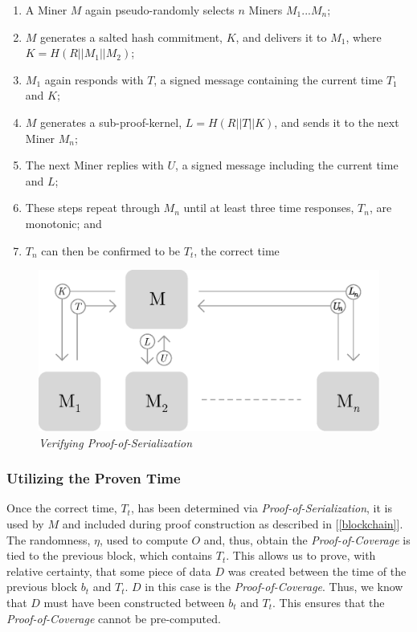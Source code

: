 \documentclass[10pt, nonatbib, nocopyrightspace, reprint]{sigplanconf}
\newcommand{\secref}[1]{[\autoref{#1}]}
\begin{document}
\begin{enumerate}
    \item A Miner $M$ again pseudo-randomly selects $n$ Miners $M_1$...$M_n$;
    \item $M$ generates a salted hash commitment, $K$, and delivers it to $M_1$, where ${K = H\left(R || M_1 || M_2\right)}$;
    \item $M_1$ again responds with $T$, a signed message containing the current time $T_1$ and $K$;
    \item $M$ generates a sub-proof-kernel, $L = H\left(R || T || K\right)$, and sends it to the next Miner $M_n$;
    \item The next Miner replies with $U$, a signed message including the current time and $L$;
    \item These steps repeat through $M_n$ until at least three time responses, $T_n$, are monotonic; and
    \item $T_n$ can then be confirmed to be $T_t$, the correct time
\end{enumerate}

\begin{figure}[ht]
    \begin{center}
          \includegraphics[width=\columnwidth]{verify_serialization.eps}
          \caption{\emph{Verifying Proof-of-Serialization}}\label{fig:verify-serialization}
     \end{center}
\end{figure}

\subsubsection{Utilizing the Proven Time}

Once the correct time, $T_t$, has been determined via \emph{Proof-of-Serialization}, it is used by $M$ and included during proof construction as described in \secref{blockchain}. The randomness, $\eta$, used to compute $O$ and, thus, obtain the \emph{Proof-of-Coverage} is tied to the previous block, which contains $T_t$. This allows us to prove, with relative certainty, that some piece of data $D$ was created between the time of the previous block $b_t$ and $T_t$. $D$ in this case is the \emph{Proof-of-Coverage}. Thus, we know that $D$ must have been constructed between $b_t$ and $T_t$. This ensures that the \emph{Proof-of-Coverage} cannot be pre-computed.
\end{document}
